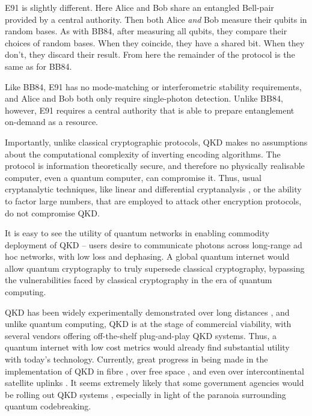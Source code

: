 E91 is slightly different. Here Alice and Bob share an entangled Bell-pair provided by a central authority. Then both Alice \textit{and} Bob measure their qubits in random bases. As with BB84, after measuring all qubits, they compare their choices of random bases. When they coincide, they have a shared bit. When they don't, they discard their result. From here the remainder of the protocol is the same as for BB84.



Like BB84, E91 has no mode-matching or interferometric stability requirements, and Alice and Bob both only require single-photon detection. Unlike BB84, however, E91 requires a central authority that is able to prepare entanglement on-demand as a resource.

Importantly, unlike classical cryptographic protocols, QKD makes no assumptions about the computational complexity of inverting encoding algorithms. The protocol is information theoretically secure, and therefore no physically realisable computer, even a quantum computer, can compromise it. Thus, usual cryptanalytic techniques, like linear and differential cryptanalysis \cite{bib:Schneier96}, or the ability to factor large numbers, that are employed to attack other encryption protocols, do not compromise QKD.

It is easy to see the utility of quantum networks in enabling commodity deployment of QKD -- users desire to communicate photons across long-range ad hoc networks, with low loss and dephasing. A global quantum internet would allow quantum cryptography to truly supersede classical cryptography, bypassing the vulnerabilities faced by classical cryptography in the era of quantum computing.

QKD has been widely experimentally demonstrated over long distances \cite{bib:Muller96}, and unlike quantum computing, QKD is at the stage of commercial viability, with several vendors offering off-the-shelf plug-and-play QKD systems. Thus, a quantum internet with low cost metrics would already find substantial utility with today's technology. Currently, great progress in being made in the implementation of QKD in fibre \cite{???}, over free space \cite{bib:Buttler00}, and even over intercontinental satellite uplinks \cite{JWP}. It seems extremely likely that some government agencies would be rolling out QKD systems \cite{bib:Secret}, especially in light of the paranoia surrounding quantum codebreaking.

